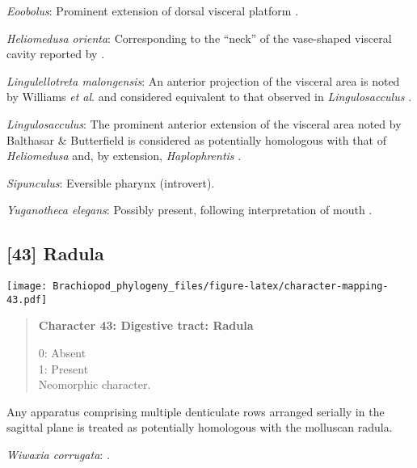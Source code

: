\documentclass[openany]{book}
\theoremstyle{definition}
\theoremstyle{definition}
\theoremstyle{definition}
\theoremstyle{remark}
\begin{document}
\hypertarget{Eoobolus-coding-42}{}
\emph{Eoobolus}: Prominent extension of dorsal visceral platform
\citep{Balthasar2009Thebrachiopod}.

\hypertarget{Heliomedusa_orienta-coding-42}{}
\emph{Heliomedusa orienta}: Corresponding to the ``neck'' of the
vase-shaped visceral cavity reported by
\citet{Zhang2009Architectureand}.

\hypertarget{Lingulellotreta_malongensis-coding-42}{}
\emph{Lingulellotreta malongensis}: An anterior projection of the
visceral area is noted by Williams \emph{et al}.
\citeyearpar{Williams2000LinguliformeaCraniiformea} and considered
equivalent to that observed in \emph{Lingulosacculus}
\citep{Balthasar2009EarlyCambrian}.

\hypertarget{Lingulosacculus-coding-42}{}
\emph{Lingulosacculus}: The prominent anterior extension of the visceral
area noted by Balthasar \& Butterfield
\citeyearpar{Balthasar2009EarlyCambrian} is considered as potentially
homologous with that of \emph{Heliomedusa}
\citep{Zhang2009Architectureand} and, by extension, \emph{Haplophrentis}
\citep{Moysiuk2017Hyolithsare}.

\hypertarget{Sipunculus-coding-42}{}
\emph{Sipunculus}: Eversible pharynx (introvert).

\hypertarget{Yuganotheca_elegans-coding-42}{}
\emph{Yuganotheca elegans}: Possibly present, following interpretation
of mouth \citep[see fig. 2c, d in][]{Zhang2014Anearly}.

\subsection*{{[}43{]} Radula}\label{radula}

\texttt{[image: Brachiopod\_phylogeny\_files/figure-latex/character-mapping-43.pdf]}

\begin{quote}
\textbf{Character 43: Digestive tract: Radula}

0: Absent\\
1: Present\\
Neomorphic character.
\end{quote}

Any apparatus comprising multiple denticulate rows arranged serially in
the sagittal plane is treated as potentially homologous with the
molluscan radula.

\hypertarget{Wiwaxia_corrugata-coding-43}{}
\emph{Wiwaxia corrugata}: \citet{Smith2012M}.
\end{document}
